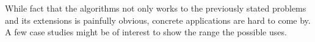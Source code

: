 While fact that the algorithms not only works to the previously stated problems and its extensions is painfully obvious, concrete applications are hard to come by. A few case studies might be of interest to show the range the possible uses.
